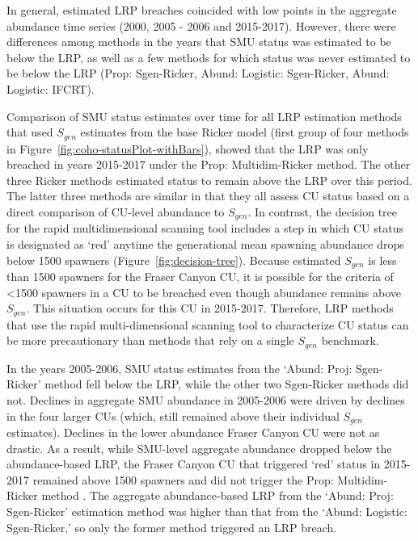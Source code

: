 \documentclass[11pt]{book}
\begin{document}
In general, estimated LRP breaches coincided with low points in the aggregate abundance time series (2000, 2005 - 2006 and 2015-2017). However, there were differences among methods in the years that SMU status was estimated to be below the LRP, as well as a few methods for which status was never estimated to be below the LRP (Prop: Sgen-Ricker, Abund: Logistic: Sgen-Ricker, Abund: Logistic: IFCRT).

Comparison of SMU status estimates over time for all LRP estimation methods that used \(S_{gen}\) estimates from the base Ricker model (first group of four methods in Figure~\ref{fig:coho-statusPlot-withBars}), showed that the LRP was only breached in years 2015-2017 under the Prop: Multidim-Ricker method. The other three Ricker methods estimated status to remain above the LRP over this period. The latter three methods are similar in that they all assess CU status based on a direct comparison of CU-level abundance to \(S_{gen}\). In contrast, the decision tree for the rapid multidimensional scanning tool includes a step in which CU status is designated as `red' anytime the generational mean spawning abundance drops below 1500 spawners (Figure~\ref{fig:decision-tree}). Because estimated \(S_{gen}\) is less than 1500 spawners for the Fraser Canyon CU, it is possible for the criteria of \textless1500 spawners in a CU to be breached even though abundance remains above \(S_{gen}\). This situation occurs for this CU in 2015-2017. Therefore, LRP methods that use the rapid multi-dimensional scanning tool to characterize CU status can be more precautionary than methods that rely on a single \(S_{gen}\) benchmark.

In the years 2005-2006, SMU status estimates from the `Abund: Proj: Sgen-Ricker' method fell below the LRP, while the other two Sgen-Ricker methods did not. Declines in aggregate SMU abundance in 2005-2006 were driven by declines in the four larger CUs (which, still remained above their individual \(S_{gen}\) estimates). Declines in the lower abundance Fraser Canyon CU were not as drastic. As a result, while SMU-level aggregate abundance dropped below the abundance-based LRP, the Fraser Canyon CU that triggered `red' status in 2015-2017 remained above 1500 spawners and did not trigger the Prop: Multidim-Ricker method . The aggregate abundance-based LRP from the `Abund: Proj: Sgen-Ricker' estimation method was higher than that from the `Abund: Logistic: Sgen-Ricker,' so only the former method triggered an LRP breach.
\end{document}
